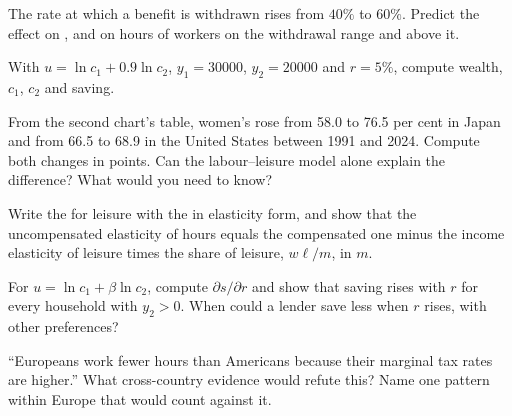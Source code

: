 \begin{exercise}[$\star\star$]\label{exo:b1:labour-supply-and-saving:withdrawal}
The rate at which a benefit is withdrawn rises from $40\%$ to $60\%$. Predict
the effect on , and on hours of workers on the withdrawal
range and above it.
\end{exercise}

\begin{exercise}[$\star\star$]\label{exo:b1:labour-supply-and-saving:two-period}
With $u = \ln c_1 + 0.9\ln c_2$, $y_1 = 30000$, $y_2 = 20000$ and $r = 5\%$, compute
wealth, $c_1$, $c_2$ and saving.
\end{exercise}

\begin{exercise}[$\star\star$]\label{exo:b1:labour-supply-and-saving:women}
From the second chart's table, women's  rose from 58.0 to 76.5
per cent in Japan and from 66.5 to 68.9 in the United States between 1991
and 2024. %
Compute both changes in points. Can the labour--leisure model alone explain
the difference? What would you need to know?
\end{exercise}

\begin{exercise}[$\star\star\star$]\label{exo:b1:labour-supply-and-saving:slutsky}
Write the  for leisure with the  in
elasticity form, and show that the uncompensated elasticity of hours
equals the compensated one minus the income elasticity of leisure times
the share of leisure, $w\ell/m$, in  $m$.
\end{exercise}

\begin{exercise}[$\star\star\star$]\label{exo:b1:labour-supply-and-saving:borrower}
For $u = \ln c_1 + \beta\ln c_2$, compute $\partial s/\partial r$ and show that
saving rises with $r$ for every household with $y_2 > 0$. When could a
lender save less when $r$ rises, with other preferences?
\end{exercise}

\begin{exercise}[$\star\star\star$]\label{exo:b1:labour-supply-and-saving:refute}
``Europeans work fewer hours than Americans because their marginal tax
rates are higher.'' What cross-country evidence would refute this? Name
one pattern within Europe that would count against it.
\end{exercise}

